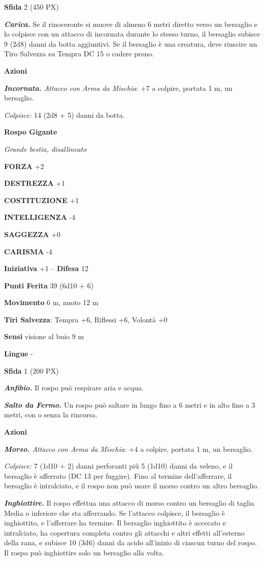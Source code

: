 \begin{multicols}{2}
	\textbf{Sfida} 2 (450 PX)

	\textit{\textbf{Carica.}} Se il rinoceronte si muove di almeno 6 metri diretto verso un bersaglio e lo colpisce con un attacco di incornata durante lo stesso turno, il bersaglio subisce 9 (2d8) danni da botta aggiuntivi. Se il bersaglio è una creatura, deve riuscire un Tiro Salvezza su Tempra DC 15 o cadere prono.

	\textbf{Azioni}

	\textit{\textbf{Incornata.} Attacco con Arma da Mischia}: +7 a colpire, portata 1 m, un bersaglio.

	\textit{Colpisce:} 14 (2d8 + 5) danni da botta.

	\medskip\textbf{Rospo Gigante}

	\textit{Grande bestia, disallineato}

	\textbf{FORZA} +2

	\textbf{DESTREZZA} +1

	\textbf{COSTITUZIONE} +1

	\textbf{INTELLIGENZA} -4

	\textbf{SAGGEZZA} +0

	\textbf{CARISMA} -4

	\textbf{Iniziativa} +1 -- \textbf{Difesa} 12

	\textbf{Punti Ferita} 39 (6d10 + 6)

	\textbf{Movimento} 6 m, nuoto 12 m

	\textbf{Tiri Salvezza}: Tempra +6, Riflessi +6, Volontà +0

	\textbf{Sensi} visione al buio 9 m

	\textbf{Lingue} -

	\textbf{Sfida} 1 (200 PX)

	\textit{\textbf{Anfibio.}} Il rospo può respirare aria e acqua.

	\textit{\textbf{Salto da Fermo.}} Un rospo può saltare in lungo fino a 6 metri e in alto fino a 3 metri, con o senza la rincorsa.

	\textbf{Azioni}

	\textit{\textbf{Morso.} Attacco con Arma da Mischia}: +4 a colpire, portata 1 m, un bersaglio.

	\textit{Colpisce:} 7 (1d10 + 2) danni perforanti più 5 (1d10) danni da veleno, e il bersaglio è afferrato (DC 13 per fuggire). Fino al termine dell'afferrare, il bersaglio è intralciato, e il rospo non può usare il morso contro un altro bersaglio.

	\textit{\textbf{Inghiottire.}} Il rospo effettua una attacco di morso contro un bersaglio di taglia Media o inferiore che sta afferrando. Se l'attacco colpisce, il bersaglio è inghiottito, e l'afferrare ha termine. Il bersaglio inghiottito è accecato e intralciato, ha copertura completa contro gli attacchi e altri effetti all'esterno della rana, e subisce 10 (3d6) danni da acido all'inizio di ciascun turno del rospo. Il rospo può inghiottire solo un bersaglio alla volta.


\end{multicols}
